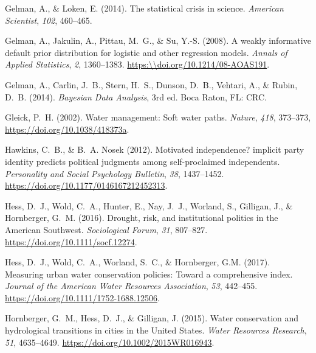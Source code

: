 \documentclass[draft]{agujournal}
\begin{document}
\begin{thebibliography}{33}
  Gelman, A., \& Loken, E. (2014).
  The statistical crisis in science.
  \textit{American Scientist}, \textit{102}, 460--465.

  Gelman, A., Jakulin, A., Pittau, M.~G., \& Su, Y.-S. (2008).
  A weakly informative default prior distribution for logistic and other
  regression models.
  \textit{Annals of Applied Statistics}, \textit{2}, 1360--1383.
  \url{https:\\doi.org/10.1214/08-AOAS191}.

  Gelman, A., Carlin, J.~B., Stern, H.~S., Dunson, D.~B., Vehtari, A., \&
  Rubin, D.~B. (2014).
  \textit{{B}ayesian Data Analysis}, 3rd ed.
  Boca Raton, FL: CRC.

  Gleick, P.~H. (2002).
  Water management: {S}oft water paths.
  \textit{Nature},
  \textit{418}, 373--373, \url{https://doi.org/10.1038/418373a}.

  Hawkins, C.~B., \& B.~A. Nosek (2012).
  Motivated independence? implicit party identity predicts political judgments
  among self-proclaimed independents.
  \textit{Personality and Social Psychology Bulletin}, \textit{38}, 1437--1452.
  \url{https://doi.org/10.1177/0146167212452313}.

  Hess, D.~J., Wold, C.~A., Hunter, E., Nay, J.~J., Worland, S., Gilligan, J.,
  \& Hornberger, G.~M. (2016).
  Drought, risk, and institutional politics in the {A}merican {S}outhwest.
  \textit{Sociological Forum}, \textit{31}, 807--827.
  \url{https://doi.org/10.1111/socf.12274}.

  Hess, D.~J., Wold, C.~A., Worland, S.~C., \& Hornberger, G.M. (2017).
  Measuring urban water conservation policies: Toward a comprehensive index.
  \textit{Journal of the American Water Resources Association},
  \textit{53}, 442--455.
  \url{https://doi.org/10.1111/1752-1688.12506}.

  Hornberger, G.~M., Hess, D.~J., \& Gilligan, J. (2015).
  Water conservation and hydrological transitions in cities in the {U}nited {S}tates.
  \textit{Water Resources Research}, \textit{51}, 4635--4649.
  \url{https://doi.org/10.1002/2015WR016943}.


\end{thebibliography}
\end{document}
